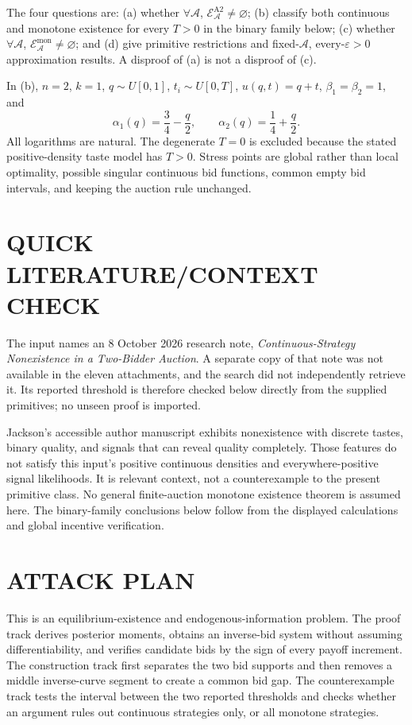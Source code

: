 \documentclass[11pt,a4paper]{article}
\theoremstyle{remark}\newtheorem{remark}[theorem]{Remark}
\begin{document}
The four questions are: (a) whether $\forall\mathcal A$, $\mathcal E_{\mathcal A}^{\mathrm{A2}}\ne\varnothing$; (b) classify both continuous and monotone existence for every $T>0$ in the binary family below; (c) whether $\forall\mathcal A$, $\mathcal E_{\mathcal A}^{\mathrm{mon}}\ne\varnothing$; and (d) give primitive restrictions and fixed-$\mathcal A$, every-$\varepsilon>0$ approximation results. A disproof of (a) is not a disproof of (c).

In (b), $n=2$, $k=1$, $q\sim U[0,1]$, $t_i\sim U[0,T]$, $u(q,t)=q+t$, $\beta_1=\beta_2=1$, and
\[
 \alpha_1(q)=\frac34-\frac q2,\qquad \alpha_2(q)=\frac14+\frac q2.
\]
All logarithms are natural. The degenerate $T=0$ is excluded because the stated positive-density taste model has $T>0$. Stress points are global rather than local optimality, possible singular continuous bid functions, common empty bid intervals, and keeping the auction rule unchanged.

\section{QUICK LITERATURE/CONTEXT CHECK}
The input names an 8 October 2026 research note, \emph{Continuous-Strategy Nonexistence in a Two-Bidder Auction}. A separate copy of that note was not available in the eleven attachments, and the search did not independently retrieve it. Its reported threshold is therefore checked below directly from the supplied primitives; no unseen proof is imported.

Jackson's accessible author manuscript \cite{jackson} exhibits nonexistence with discrete tastes, binary quality, and signals that can reveal quality completely. Those features do not satisfy this input's positive continuous densities and everywhere-positive signal likelihoods. It is relevant context, not a counterexample to the present primitive class. No general finite-auction monotone existence theorem is assumed here. The binary-family conclusions below follow from the displayed calculations and global incentive verification.

\section{ATTACK PLAN}
This is an equilibrium-existence and endogenous-information problem. The proof track derives posterior moments, obtains an inverse-bid system without assuming differentiability, and verifies candidate bids by the sign of every payoff increment. The construction track first separates the two bid supports and then removes a middle inverse-curve segment to create a common bid gap. The counterexample track tests the interval between the two reported thresholds and checks whether an argument rules out continuous strategies only, or all monotone strategies.
\end{document}
